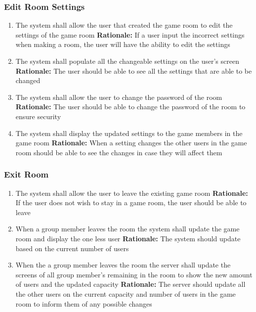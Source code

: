 \documentclass[12pt]{article}
\begin{document}
\subsubsection{Edit Room Settings}
\begin{enumerate}[label=RS\arabic*., series=EditRoom]
	\item The system shall allow the user that created the game room to edit the settings of the game room\newline 
    \textbf{Rationale:} If a user input the incorrect settings when making a room, the user will have the ability to edit the settings 
    \item The system shall populate all the changeable settings on the user's screen\newline 
    \textbf{Rationale:} The user should be able to see all the settings that are able to be changed
    \item The system shall allow the user to change the password of the room\newline 
    \textbf{Rationale:} The user should be able to change the password of the room to ensure security
    \item The system shall display the updated settings to the game members in the game room\newline 
    \textbf{Rationale:} When a setting changes the other users in the game room should be able to see the changes in case they will affect them
\end{enumerate}

\subsubsection{Exit Room}
\begin{enumerate}[label=ER\arabic*., series=ExitRoom]
    \item The system shall allow the user to leave the existing game room\newline 
    \textbf{Rationale:} If the user does not wish to stay in a game room, the user should be able to leave
    \item When a group member leaves the room the system shall update the game room and display the one less user\newline 
    \textbf{Rationale:} The system should update based on the current number of users
    \item When the a group member leaves the room the server shall update the screens of all group member's remaining in the room to show the new amount of users and the updated capacity\newline 
    \textbf{Rationale:} The server should update all the other users on the current capacity and number of users in the game room to inform them of any possible changes
\end{enumerate}
\end{document}
